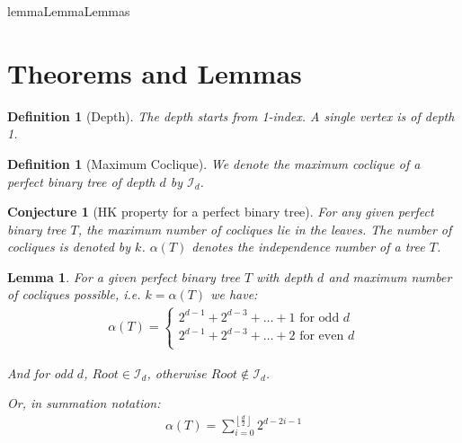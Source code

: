 \documentclass{article}
\newtheorem{lemma}[theorem]{Lemma}
\newtheorem{conjecture}[theorem]{Conjecture}
\newtheorem{definition}[theorem]{Definition}
\theoremstyle{definition}
\begin{document}
\refname{lemma}{Lemma}{Lemmas}
\section{Theorems and Lemmas}

\begin{definition}[Depth]
	The depth starts from 1-index. A single vertex is of depth 1.
\end{definition}

\begin{definition}[Maximum Coclique]
	We denote the maximum coclique of a perfect binary tree of depth $d$ by $\mathcal{I}_d$.
\end{definition}

\begin{conjecture}[HK property for a perfect binary tree]
	For any given perfect binary tree $T$, the maximum number of cocliques lie in the leaves. The number of cocliques is denoted by $k$. $\alpha(T)$ denotes the independence number of a tree $T$.
\end{conjecture}

\begin{lemma}\label{independence_num}
	For a given perfect binary tree $T$ with depth $d$ and maximum number of cocliques possible, i.e. $k = \alpha(T)$ we have:
	\begin{align*}
		\alpha(T) = \begin{cases}
			            2^{d - 1} + 2^{d-3} + \ldots + 1 \text{ for odd $d$}  \\
			            2^{d - 1} + 2^{d-3} + \ldots + 2 \text{ for even $d$} \\
		            \end{cases}
	\end{align*}

	And for odd $d$, $Root \in \mathcal{I}_d$, otherwise $Root \not\in \mathcal{I}_d$.

	Or, in summation notation:
	\begin{align*}
		\alpha(T) = \sum_{i= 0}^{\left\lfloor\frac{d}{2}\right\rfloor} 2^{d - 2i - 1}
	\end{align*}
\end{lemma}
\end{document}

